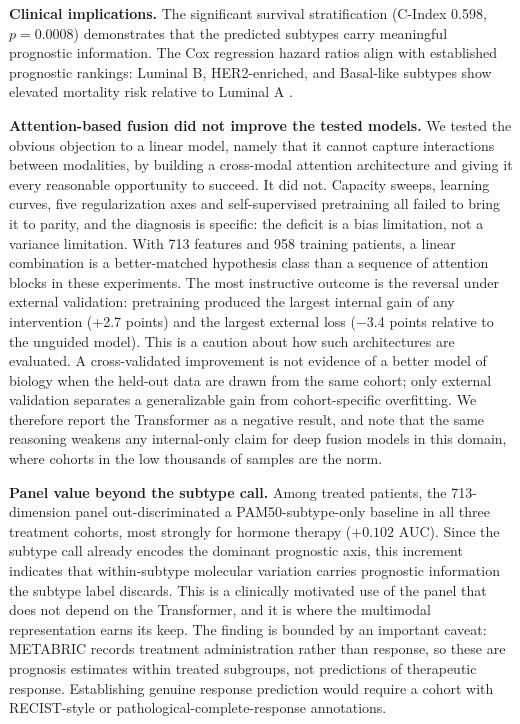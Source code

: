 \documentclass[11pt,a4paper]{article}
\begin{document}
\textbf{Clinical implications.} The significant survival stratification (C-Index 0.598, $p = 0.0008$) demonstrates that the predicted subtypes carry meaningful prognostic information. The Cox regression hazard ratios align with established prognostic rankings: Luminal B, HER2-enriched, and Basal-like subtypes show elevated mortality risk relative to Luminal A \citep{prat2014research}.


\textbf{Attention-based fusion did not improve the tested models.} We tested the
obvious objection to a linear model, namely that it cannot capture interactions between modalities, by
building a cross-modal attention architecture and giving it every reasonable opportunity to
succeed. It did not. Capacity sweeps, learning curves, five regularization axes and
self-supervised pretraining all failed to bring it to parity, and the diagnosis is specific: the
deficit is a bias limitation, not a variance limitation. With 713 features and 958 training
patients, a linear combination is a better-matched hypothesis class than a sequence of attention
blocks in these experiments. The most instructive outcome is the reversal under external
validation: pretraining produced the largest internal gain of any intervention (+2.7 points) and
the largest external loss ($-$3.4 points relative to the unguided model). This is a caution
about how such architectures are evaluated. A cross-validated improvement is not evidence of a
better model of biology when the held-out data are drawn from the same cohort; only external
validation separates a generalizable gain from cohort-specific overfitting. We therefore report
the Transformer as a negative result, and note that the same reasoning weakens any internal-only
claim for deep fusion models in this domain, where cohorts in the low thousands of samples are
the norm.

\textbf{Panel value beyond the subtype call.} Among treated patients, the 713-dimension panel
out-discriminated a PAM50-subtype-only baseline in all three treatment cohorts, most strongly
for hormone therapy ($+0.102$ AUC). Since the subtype call already encodes the dominant
prognostic axis, this increment indicates that within-subtype molecular variation carries
prognostic information the subtype label discards. This is a clinically motivated use of the
panel that does not depend on the Transformer, and it is where the multimodal representation
earns its keep. The finding is bounded by an important caveat: METABRIC records treatment
administration rather than response, so these are prognosis estimates within treated subgroups,
not predictions of therapeutic response. Establishing genuine response prediction would require
a cohort with RECIST-style or pathological-complete-response annotations.
\end{document}
